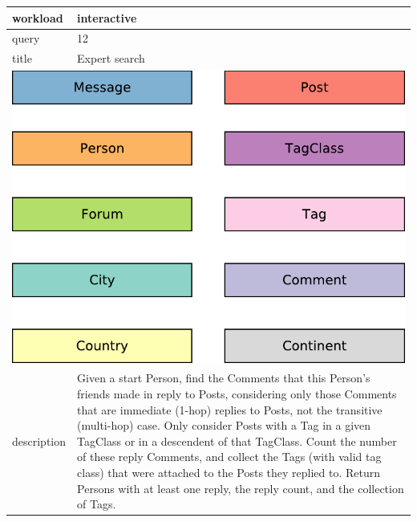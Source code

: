 \renewcommand*{\arraystretch}{1.1}

\noindent\begin{tabularx}{17cm}{|p{1.95cm}|X|}
	\hline
	workload    & interactive \\ \hline
%
	query       & 12 \\ \hline
%
	title       & Expert search \\ \hline
	\multicolumn{2}{|c|}{ \includegraphics[scale=\patternscale,margin=0cm .2cm]{patterns/interactive12}} \\ \hline
	description & Given a start Person, find the Comments that this Person's friends made
in reply to Posts, considering only those Comments that are immediate
(1-hop) replies to Posts, not the transitive (multi-hop) case. Only
consider Posts with a Tag in a given TagClass or in a descendent of that
TagClass. Count the number of these reply Comments, and collect the Tags
(with valid tag class) that were attached to the Posts they replied to.
Return Persons with at least one reply, the reply count, and the
collection of Tags.
 \\ \hline
	

\end{tabularx}
